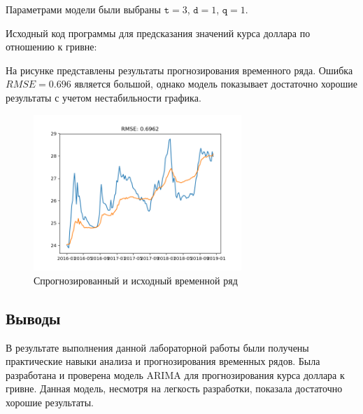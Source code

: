 Параметрами модели были выбраны $\texttt{t}=3$, $\texttt{d}=1$, $\texttt{q}=1$.

Исходный код программы для предсказания значений курса доллара по отношению к гривне: 


На рисунке представлены результаты прогнозирования временного ряда. Ошибка $RMSE = 0.696$ является большой, однако модель показывает достаточно хорошие результаты с учетом нестабильности графика.

\begin{figure}[H]
    \centering
        \includegraphics[width=0.7\textwidth]{series_week_ARIMA}
    \caption{Спрогнозированный и исходный временной ряд}
    \label{fig:series_week_ARIMA}
\end{figure}

\subsection*{Выводы}
В результате выполнения данной лабораторной работы были получены практические навыки анализа и прогнозирования временных рядов.
Была разработана и проверена модель ARIMA для прогнозирования курса доллара к гривне.
Данная модель, несмотря на легкость разработки, показала достаточно хорошие результаты.  



